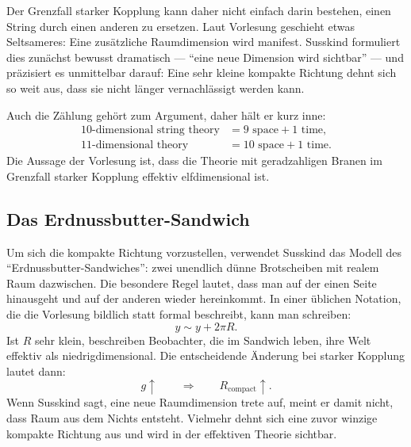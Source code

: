 Der Grenzfall starker Kopplung kann daher nicht einfach darin bestehen, einen String durch einen anderen zu ersetzen. Laut Vorlesung geschieht etwas Seltsameres: Eine zusätzliche Raumdimension wird manifest. Susskind formuliert dies zunächst bewusst dramatisch --- ``eine neue Dimension wird sichtbar'' --- und präzisiert es unmittelbar darauf: Eine sehr kleine kompakte Richtung dehnt sich so weit aus, dass sie nicht länger vernachlässigt werden kann.

Auch die Zählung gehört zum Argument, daher hält er kurz inne:
\begin{equation}
\begin{aligned}
10\text{-dimensional string theory} &= 9\text{ space}+1\text{ time},\\
11\text{-dimensional theory} &= 10\text{ space}+1\text{ time}.
\end{aligned}
\end{equation}
Die Aussage der Vorlesung ist, dass die Theorie mit geradzahligen Branen im Grenzfall starker Kopplung effektiv elfdimensional ist.


\subsection{Das Erdnussbutter-Sandwich}

Um sich die kompakte Richtung vorzustellen, verwendet Susskind das Modell des ``Erdnussbutter-Sandwiches'': zwei unendlich dünne Brotscheiben mit realem Raum dazwischen. Die besondere Regel lautet, dass man auf der einen Seite hinausgeht und auf der anderen wieder hereinkommt. In einer üblichen Notation, die die Vorlesung bildlich statt formal beschreibt, kann man schreiben:
\begin{equation}
y \sim y + 2\pi R.
\end{equation}
Ist \(R\) sehr klein, beschreiben Beobachter, die im Sandwich leben, ihre Welt effektiv als niedrigdimensional. Die entscheidende Änderung bei starker Kopplung lautet dann:
\begin{equation}
g\uparrow
\qquad \Longrightarrow \qquad
R_{\mathrm{compact}}\uparrow.
\end{equation}
Wenn Susskind sagt, eine neue Raumdimension trete auf, meint er damit nicht, dass Raum aus dem Nichts entsteht. Vielmehr dehnt sich eine zuvor winzige kompakte Richtung aus und wird in der effektiven Theorie sichtbar.

